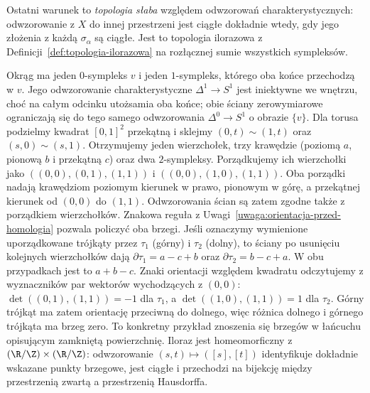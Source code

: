 Ostatni warunek to \emph{topologia słaba}
względem odwzorowań charakterystycznych:
odwzorowanie z $X$ do innej przestrzeni
jest ciągłe dokładnie wtedy, gdy jego
złożenia z każdą $\sigma_\alpha$ są ciągłe.
Jest to topologia ilorazowa z
Definicji~\ref{def:topologia-ilorazowa}
na rozłącznej sumie wszystkich sympleksów.

\begin{przyklad}
\label{prz:delta-torus}
Okrąg ma jeden $0$-sympleks $v$
i jeden $1$-sympleks, którego oba końce
przechodzą w $v$. Jego odwzorowanie charakterystyczne
$\Delta^1\to S^1$ jest iniektywne we wnętrzu,
choć na całym odcinku utożsamia oba końce;
obie ściany zerowymiarowe ograniczają się do
tego samego odwzorowania $\Delta^0\to S^1$
o obrazie $\{v\}$.
Dla torusa
podzielmy kwadrat $[0,1]^2$
przekątną i sklejmy
$(0,t)\sim(1,t)$ oraz
$(s,0)\sim(s,1)$. Otrzymujemy
jeden wierzchołek, trzy krawędzie
(poziomą $a$, pionową $b$ i przekątną
$c$) oraz dwa $2$-sympleksy. Porządkujemy ich wierzchołki jako
$((0,0),(0,1),(1,1))$ i $((0,0),(1,0),(1,1))$.
Oba porządki nadają krawędziom poziomym kierunek w prawo,
pionowym w górę, a przekątnej kierunek od $(0,0)$ do $(1,1)$.
Odwzorowania ścian są zatem zgodne także z porządkiem wierzchołków.
Znakowa reguła z Uwagi~\ref{uwaga:orientacja-przed-homologia}
pozwala policzyć oba brzegi. Jeśli oznaczymy wymienione
uporządkowane trójkąty przez $\tau_1$ (górny) i $\tau_2$ (dolny),
to ściany po usunięciu kolejnych wierzchołków dają
$\partial\tau_1=a-c+b$ oraz $\partial\tau_2=b-c+a$.
W obu przypadkach jest to $a+b-c$.
Znaki orientacji względem kwadratu odczytujemy z wyznaczników
par wektorów wychodzących z $(0,0)$:
$\det((0,1),(1,1))=-1$ dla $\tau_1$,
a $\det((1,0),(1,1))=1$ dla $\tau_2$.
Górny trójkąt ma zatem orientację przeciwną do dolnego,
więc różnica dolnego i górnego trójkąta ma brzeg zero.
To konkretny przykład znoszenia się brzegów
w łańcuchu opisującym zamkniętą powierzchnię.
Iloraz jest homeomorficzny z
$(\R/\Z)\times(\R/\Z)$:
odwzorowanie $(s,t)\mapsto([s],[t])$
identyfikuje dokładnie wskazane
punkty brzegowe, jest ciągłe
i przechodzi na bijekcję
między przestrzenią zwartą
a przestrzenią Hausdorffa.
\end{przyklad}

